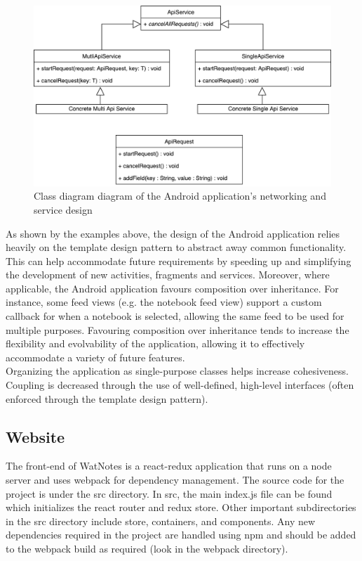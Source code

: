 \documentclass[12pt]{article}
\begin{document}
    \begin{figure}[H]
      \includegraphics[width=\textwidth]{assets/android-network-class.pdf}
      \caption{Class diagram diagram of the Android application's networking and service design}
    \end{figure}

    As shown by the examples above, the design of the Android application relies heavily on the template design pattern to abstract away common functionality. This can help
    accommodate future requirements by speeding up and simplifying the development of new activities, fragments and services. Moreover, where applicable, the Android application
    favours composition over inheritance. For instance, some feed views (e.g. the notebook feed view) support a custom callback for when a notebook is selected, allowing the same
    feed to be used for multiple purposes. Favouring composition over inheritance tends to increase the flexibility and evolvability of the application, allowing it to effectively
    accommodate a variety of future features. \\

    Organizing the application as single-purpose classes helps increase cohesiveness. Coupling is decreased through the use of well-defined, high-level interfaces (often enforced
    through the template design pattern).

  \subsection{Website}
  The front-end of WatNotes is a react-redux application that runs on a node server and uses webpack for dependency management. The source code for the project is under the src directory. In src, the main index.js file can be found which initializes the react router and redux store. Other important subdirectories in the src directory include store, containers, and components. Any new dependencies required in the project are handled using npm and should be added to the webpack build as required (look in the webpack directory).\\
\end{document}
